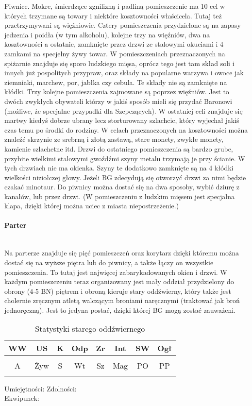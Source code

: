 \documentclass{article}
\newcommand{\whtable}[1]{
    \begin{table}[h]
        \caption{{#1}}
        \vspace{4pt}
        \centering
            \begin{tabular}{|c|c|c|c|c|c|c|c|}
                \hline
                WW & US & K & Odp & Zr & Int & SW & Ogł \\ \hline
                 &  &  &  &  &  &  &  \\ \hline
                A & Żyw & S & Wt & Sz & Mag & PO & PP \\ \hline
                 &  &  &  &  &  &  &  \\ \hline
                \end{tabular}
    \end{table}

    \noindent
    Umiejętności:
    \hspace{150pt}
    Zdolności:
    \vspace{50pt}\\
    Ekwipunek:
    \vspace{50pt}
}
\begin{document}
Piwnice. Mokre, śmierdzące zgnilizną i padliną pomieszczenie ma 10 cel w których trzymane są towary i niektóre kosztowności właścicela. Tutaj też przetrzymywani są więźniowie. Cztery pomieszczenia przydzielone są na zapasy jedzenia i poidła (w tym alkoholu), kolejne trzy na więźniów, dwa na kosztowności a ostatnie, zamknięte przez drzwi ze stalowymi okuciami i 4 zamkami na specjelny żywy towar. W pomieszczeniach przeznaczonych na spiżarnie znajduje się sporo ludzkiego mięsa, oprócz tego jest tam skład soli i innych już pospolitych przypraw, oraz składy na popularne warzywa i owoce jak ziemniaki, marchew, por, jabłka czy cebula. Te składy nie są zamknięte na kłódki. Trzy kolejne pomieszczenia zajmowane są poprzez więźniów. Jest to dwóch zwykłych obywateli którzy w jakiś sposób mieli się przydać Baronowi (możliwe, że specjalne przypadki dla Szepczących). W ostatniej celi znajduje się martwy kiedyś dobrze ubrany lecz storturowany szlachcic, który wyjechał jakiś czas temu po środki do rodziny. W celach przeznaczonych na kosztowności można znaleźć skrzynie ze srebrną i złotą zastawą, stare monety, zwykłe monety, kamienie szlachetne itd. Drzwi do ostatniego pomieszczenia są bardzo grube, przybite wielkimi stalowymi gwoźdźmi szyny metalu trzymają je przy ścianie. W tych drzwiach nie ma okienka. Szyny te dodatkowo zamknięte są na 4 kłódki wielkości niziołczej głowy. Jeżeli BG zdecydują się otworzyć drzwi za nimi będzie czakać minotaur. Do piwnicy można dostać się na dwa sposoby, wybić dziurę z kanałów, lub przez drzwi. (W pomieszczeniu z ludzkim mięsem jest specjalna klapa, dzięki której można uciec z miasta niepostrzeżenie.)

\paragraph{\Large{Parter}}\mbox{}\\

Na parterze znajduje się pięć pomieszczeń oraz korytarz dzięki któremu można dostać się na wyższe piętra lub do piwnicy, a także łączy on wszystkie pomieszczenia. To tutaj jest najwięcej zabarykadowanych okien i drzwi. W każdym pomieszczeniu teraz organizowany jest mały oddział przydzielony do obrony (4-5 BN) piętrem i obroną kieruje stary oddźwierny, który także jest cholernie zręcznym atletą walczącym broniami naręcznymi (traktować jak broń jednoręczną). Jest to jedyna postać, dzięki której BG mogą zostać zauważeni. 


\whtable{Statystyki starego oddźwiernego}
\end{document}
